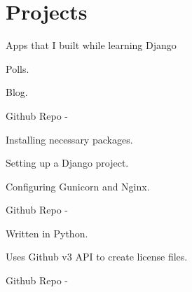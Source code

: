 \documentclass[]{deedy-resume-openfont}
\begin{document}
\begin{minipage}[t]{0.66\textwidth}

\section{Projects}

Apps that I built while learning Django
\begin{tightemize}
\item Polls.
\item Blog.
\end{tightemize}
Github Repo - \href{https://www.github.com/pattu777/LearningDjango/}{}
\sectionsep


\begin{tightemize}
\item Installing necessary packages.
\item Setting up a Django project.
\item Configuring Gunicorn and Nginx.
\end{tightemize}
Github Repo - \href{https://www.github.com/pattu777/Ansible-Django}{}
\sectionsep


\begin{tightemize}
\item Written in Python.
\item Uses Github v3 API to create license files.
\end{tightemize}
Github Repo - \href{https://www.github.com/pattu777/Lucy/}{}
\sectionsep


\end{minipage} 
\end{document}
